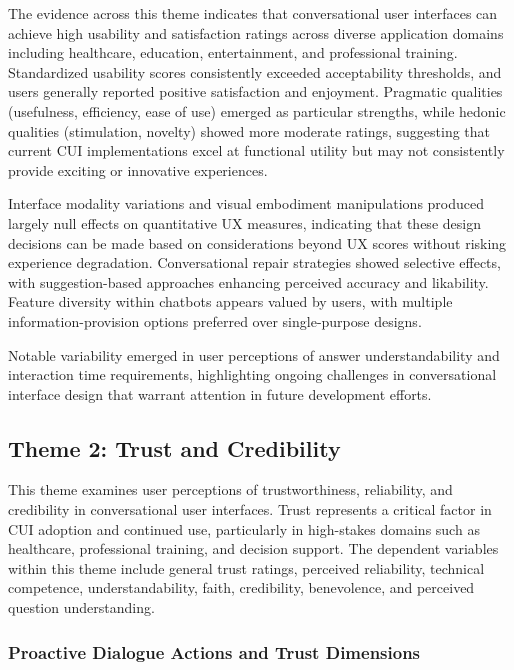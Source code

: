 \documentclass[manuscript,anonymous,sigconf]{acmart}
\begin{document}
The evidence across this theme indicates that conversational user interfaces can achieve high usability and satisfaction ratings across diverse application domains including healthcare, education, entertainment, and professional training. Standardized usability scores consistently exceeded acceptability thresholds, and users generally reported positive satisfaction and enjoyment. Pragmatic qualities (usefulness, efficiency, ease of use) emerged as particular strengths, while hedonic qualities (stimulation, novelty) showed more moderate ratings, suggesting that current CUI implementations excel at functional utility but may not consistently provide exciting or innovative experiences.

Interface modality variations and visual embodiment manipulations produced largely null effects on quantitative UX measures, indicating that these design decisions can be made based on considerations beyond UX scores without risking experience degradation. Conversational repair strategies showed selective effects, with suggestion-based approaches enhancing perceived accuracy and likability. Feature diversity within chatbots appears valued by users, with multiple information-provision options preferred over single-purpose designs.

Notable variability emerged in user perceptions of answer understandability and interaction time requirements, highlighting ongoing challenges in conversational interface design that warrant attention in future development efforts.

\subsection{Theme 2: Trust and Credibility}

This theme examines user perceptions of trustworthiness, reliability, and credibility in conversational user interfaces. Trust represents a critical factor in CUI adoption and continued use, particularly in high-stakes domains such as healthcare, professional training, and decision support. The dependent variables within this theme include general trust ratings, perceived reliability, technical competence, understandability, faith, credibility, benevolence, and perceived question understanding.

\subsubsection{Proactive Dialogue Actions and Trust Dimensions}
\end{document}
